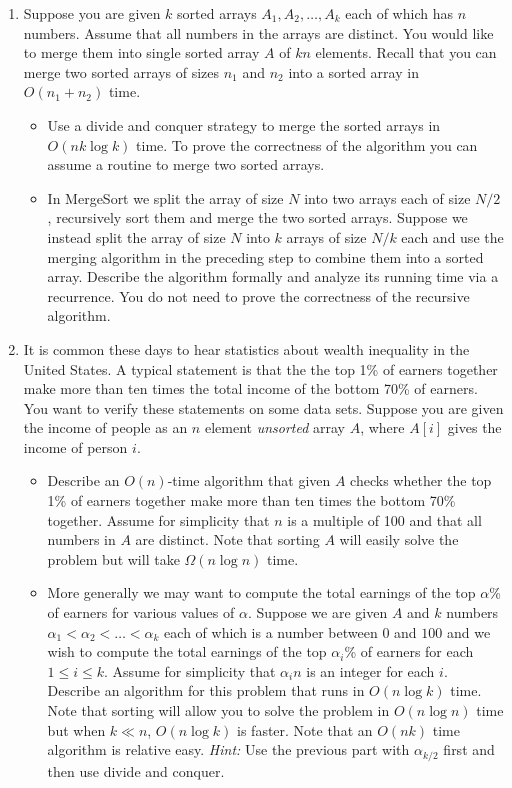 \documentclass[11pt]{article}
\begin{document}
\begin{enumerate}
\item Suppose you are given $k$ sorted arrays $A_1,A_2,\ldots,A_k$
  each of which has $n$ numbers. Assume that all numbers in the arrays
  are distinct. You would like to merge them into single sorted array
  $A$ of $kn$ elements. Recall that you can merge two sorted arrays of
  sizes $n_1$ and $n_2$ into a sorted array in $O(n_1+n_2)$ time.
  \begin{itemize}
  \item Use a divide and conquer strategy to merge the sorted arrays
    in $O(nk \log k)$ time. To prove the correctness of the algorithm
    you can assume a routine to merge two sorted arrays.
  \item In MergeSort we split the array of size $N$ into two arrays
    each of size $N/2$, recursively sort them and merge the two sorted
    arrays. Suppose we instead split the array of size $N$ into $k$
    arrays of size $N/k$ each and use the merging algorithm in the
    preceding step to combine them into a sorted array.  Describe the
    algorithm formally and analyze its running time via a recurrence.
    You do not need to prove the correctness of the recursive algorithm.
  \end{itemize}


  \item It is common these days to hear statistics about wealth inequality in
the United States. A typical statement is that the the top 1\% of
earners together make more than ten times the total income of the bottom
70\% of earners. You want to verify these statements on some data
sets. Suppose you are given the income of people as an $n$ element
\emph{unsorted} array $A$, where $A[i]$ gives the income of person
$i$.
\begin{itemize}
\item Describe an $O(n)$-time algorithm that given $A$ checks whether
  the top 1\% of earners together make more than ten times the bottom
  70\% together. Assume for simplicity that $n$ is a multiple of 100
  and that all numbers in $A$ are distinct. Note that sorting $A$ will
  easily solve the problem but will take $\Omega(n\log n)$ time.
\item More generally we may want to compute the total earnings of the
  top $\alpha$\% of earners for various values of $\alpha$. Suppose we
  are given $A$ and $k$ numbers $\alpha_1 < \alpha_2 < \ldots < \alpha_k$
  each of which is a number between $0$ and $100$ and we wish to
  compute the total earnings of the top $\alpha_i$\% of earners for
  each $1 \le i \le k$. Assume for simplicity that $\alpha_i n$ is an
  integer for each $i$. Describe an algorithm for this problem that
  runs in $O(n \log k)$ time. Note that sorting will allow you to
  solve the problem in $O(n \log n)$ time but when $k \ll n$, $O(n
  \log k)$ is faster. Note that an $O(nk)$ time algorithm is relative
  easy. {\em Hint:} Use the previous part with $\alpha_{k/2}$ first and then
  use divide and conquer.
\end{itemize}


\end{enumerate}
\end{document}
